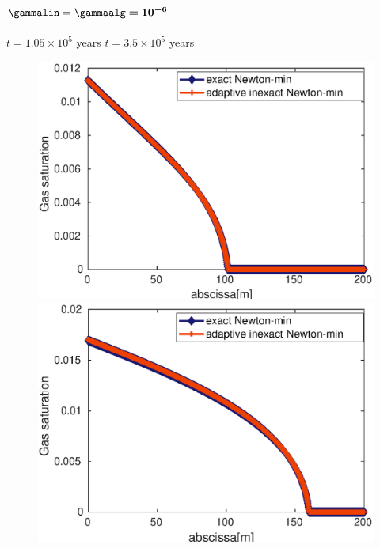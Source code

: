 \begin{frame}
\begin{overprint}
\vspace{0.2 cm}
\textcolor{red}{$\bm \gammalin= \bm \gammaalg \bm = {\bm {10^{-6}}}$}
\\\\
\textcolor{cadmiumgreen}{\hspace{2 cm} $t = 1.05 \times 10^5$ years \hspace{5 cm} $t = 3.5 \times 10^5$ years}
\begin{figure}
\centering
\includegraphics[width=0.48 \textwidth]{fig_article_chap_3/comparaison_plot_gas_saturations_exact_adapt_inexact_gamma_lin_10-6_gamma_alg_10-3_nt_21}
\includegraphics[width=0.48 \textwidth]{fig_article_chap_3/comparaison_plot_gas_saturations_exact_adapt_inexact_gamma_lin_gamma_alg_10-3_nt_70}
\end{figure}

 \end{overprint} 

\end{frame}
%


